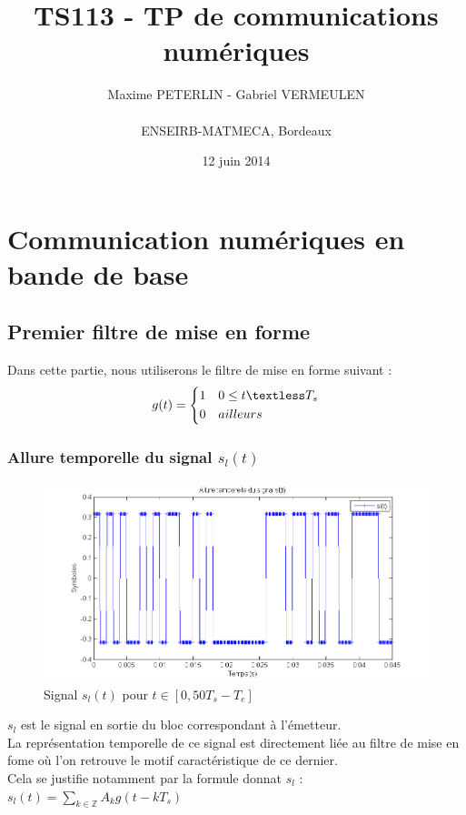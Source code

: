 \documentclass[11pt]{article}
\title{\textbf{TS113 - TP de communications numériques}}
\author{Maxime PETERLIN - Gabriel VERMEULEN\\\\{ENSEIRB-MATMECA, Bordeaux}}
\date{12 juin 2014}
\begin{document}
\maketitle
\tableofcontents

\newpage

\section{Communication numériques en bande de base}
	
	\subsection{Premier filtre de mise en forme}
		Dans cette partie, nous utiliserons le filtre de mise en forme suivant :
		\begin{equation}
			g(t) = 
			\left\{
		    	\begin{aligned}
		    		1&\,\,\,\,\,\, 0 \le t \textless T_s\\
		    		0&\,\,\,\,\,\, ailleurs
		      	\end{aligned}
		    \right.
		\end{equation}
		
		\subsubsection{Allure temporelle du signal $s_l(t)$}
			\begin{figure}[h]
				\centering
				\includegraphics[scale=0.5]{images/Q311.png}
				\caption{Signal $s_l(t)$ pour $t \in [0, 50T_s-T_e]$}
				\label{Q311}
			\end{figure}
			$s_l$ est le signal en sortie du bloc correspondant à l'émetteur. \\
			La représentation temporelle de ce signal est directement liée au filtre de mise en fome où l'on retrouve le motif caractéristique de ce dernier.\\
			Cela se justifie notamment par la formule donnat $s_l$ : $s_l(t) = \sum\limits_{k \in \mathbb{Z}} A_kg(t-kT_s)$
			
\end{document}
